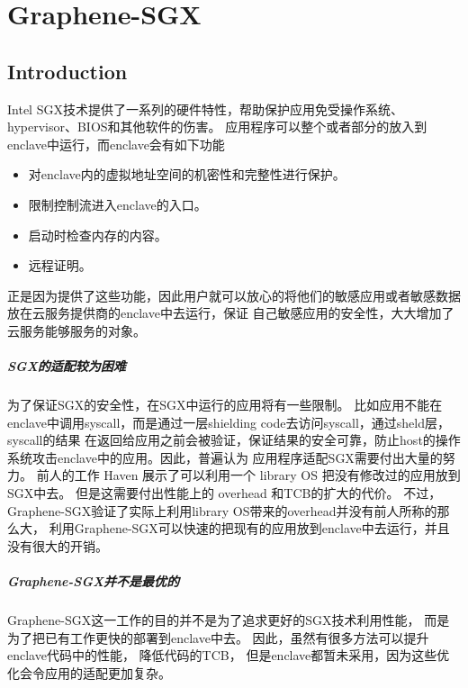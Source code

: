
\chapter{Graphene-SGX} %

\label{Chapter3} %

\section{Introduction}
Intel SGX技术提供了一系列的硬件特性，帮助保护应用免受操作系统、hypervisor、BIOS和其他软件的伤害。
应用程序可以整个或者部分的放入到enclave中运行，而enclave会有如下功能
\begin{itemize}
    \item 对enclave内的虚拟地址空间的机密性和完整性进行保护。
    \item 限制控制流进入enclave的入口。
    \item 启动时检查内存的内容。
    \item 远程证明。
\end{itemize}

正是因为提供了这些功能，因此用户就可以放心的将他们的敏感应用或者敏感数据放在云服务提供商的enclave中去运行，保证
自己敏感应用的安全性，大大增加了云服务能够服务的对象。
\paragraph{SGX的适配较为困难}为了保证SGX的安全性，在SGX中运行的应用将有一些限制。
比如应用不能在enclave中调用syscall，而是通过一层shielding code去访问syscall，通过sheld层，syscall的结果
在返回给应用之前会被验证，保证结果的安全可靠，防止host的操作系统攻击enclave中的应用。因此，普遍认为
应用程序适配SGX需要付出大量的努力。
前人的工作 Haven \cite{186173}展示了可以利用一个 library OS 把没有修改过的应用放到SGX中去。
但是这需要付出性能上的 overhead 和TCB的扩大的代价。
不过，Graphene-SGX验证了实际上利用library OS带来的overhead并没有前人所称的那么大，
利用Graphene-SGX可以快速的把现有的应用放到enclave中去运行，并且没有很大的开销。

\paragraph{Graphene-SGX并不是最优的}
Graphene-SGX这一工作的目的并不是为了追求更好的SGX技术利用性能，
而是为了把已有工作更快的部署到enclave中去。
因此，虽然有很多方法可以提升enclave代码中的性能，
降低代码的TCB，
但是enclave都暂未采用，因为这些优化会令应用的适配更加复杂。



